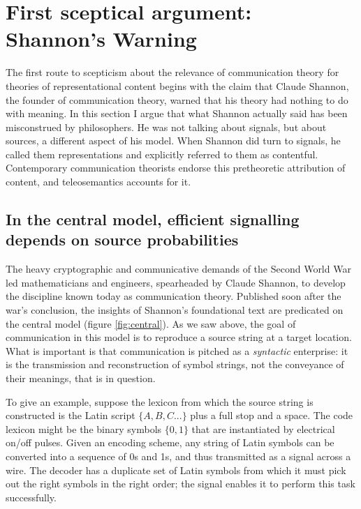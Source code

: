 \documentclass[12pt]{article}
\begin{document}

\section{First sceptical argument: Shannon's Warning}\label{sec:warning}

The first route to scepticism about the relevance of communication theory for theories of representational content begins with the claim that Claude Shannon, the founder of communication theory, warned that his theory had nothing to do with meaning.
In this section I argue that what Shannon actually said has been misconstrued by philosophers.
He was not talking about signals, but about sources, a different aspect of his model.
When Shannon did turn to signals, he called them representations and explicitly referred to them as contentful.
Contemporary communication theorists endorse this pretheoretic attribution of content, and teleosemantics accounts for it.



\subsection{In the central model, efficient signalling depends on source probabilities}
The heavy cryptographic and communicative demands of the Second World War led mathematicians and engineers, spearheaded by Claude Shannon, to develop the discipline known today as communication theory.
Published soon after the war's conclusion, the insights of Shannon's foundational text \parencite*{shannon1948mathematicalc} are predicated on the central model (figure \ref{fig:central}).
As we saw above, the goal of communication in this model is to reproduce a source string at a target location.
What is important is that communication is pitched as a \textit{syntactic} enterprise: it is the transmission and reconstruction of symbol strings, not the conveyance of their meanings, that is in question.

To give an example, suppose the lexicon from which the source string is constructed is the Latin script $\{A,B,C...\}$ plus a full stop and a space.
The code lexicon might be the binary symbols $\{0,1\}$ that are instantiated by electrical on/off pulses.
Given an encoding scheme, any string of Latin symbols can be converted into a sequence of 0s and 1s, and thus transmitted as a signal across a wire.
The decoder has a duplicate set of Latin symbols from which it must pick out the right symbols in the right order; the signal enables it to perform this task successfully.
\end{document}
